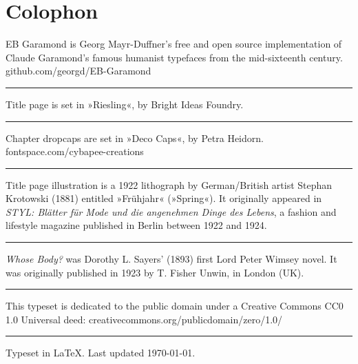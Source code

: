 \documentclass[
a5paper,
BCOR=7mm,
twoside,
DIV=calc,
11pt,
usegeometry,
chapterprefix,
headings=big]{scrbook} %
\begin{document}
\chapter*{Colophon}
\begin{center}
EB Garamond is Georg Mayr-Duffner's free and open source implementation of Claude Garamond’s famous humanist typefaces from the mid-sixteenth century.\\github.com/georgd/EB-Garamond
\vfill
\rule{0.5\textwidth}{.4pt}
\vfill
Title page is set in »Riesling«, by Bright Ideas Foundry.
\vfill
\rule{0.5\textwidth}{.4pt}
\vfill
Chapter dropcaps are set in »Deco Caps«, by Petra Heidorn.\\fontspace.com/cybapee-creations
\vfill
\rule{0.5\textwidth}{.4pt}
\vfill
Title page illustration is a 1922 lithograph by German/British artist Stephan Krotowski (1881) entitled »Frühjahr« (»Spring«). It originally appeared in \textit{STYL: Blätter für Mode und die angenehmen Dinge des Lebens}, a fashion and lifestyle magazine published in Berlin between 1922 and 1924.
\vfill
\rule{0.5\textwidth}{.4pt}
\vfill
\textit{Whose Body?} was Dorothy L. Sayers' (1893) first Lord Peter Wimsey novel. It was originally published in 1923 by T. Fisher Unwin, in London (UK).
\vfill
\rule{0.5\textwidth}{.4pt}
\vfill
This typeset is dedicated to the public domain under a Creative Commons CC0 1.0 Universal deed: creativecommons.org/publicdomain/zero/1.0/
\vfill
\rule{0.5\textwidth}{.4pt}
\vfill
Typeset in \LaTeX{}. Last updated \today.
\end{center}
\thispagestyle{empty}
\end{document}
